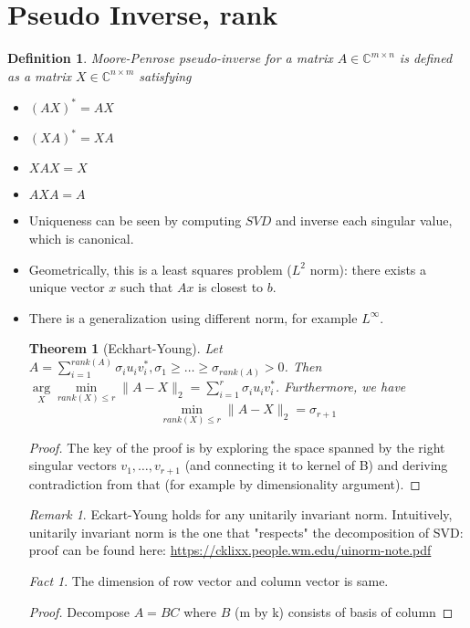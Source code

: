 \documentclass[11pt,reqno]{amsart}
\newtheorem{theorem}{Theorem}
\newtheorem{definition}{Definition}
\theoremstyle{remark}
\newtheorem{remark}[example]{Remark}
\newtheorem{fact}{Fact}
\begin{document}
\section{Pseudo Inverse, rank}
\begin{definition}
Moore-Penrose pseudo-inverse for a matrix $A\in \mathbb{C}^{m\times n}$ is defined as a matrix $X\in\mathbb{C}^{n\times m}$ satisfying
\begin{itemize}
\item $(AX)^*=AX$
\item $(XA)^* = XA$
\item $XAX=X$
\item $AXA=A$
\end{itemize}
\end{definition}
\begin{itemize}
\item Uniqueness can be seen by computing $SVD$ and inverse each singular value, which is canonical.
\item Geometrically, this is a least squares problem ($L^2$ norm): there exists a unique vector $x$ such that $Ax$ is closest to $b$.
\item There is a generalization using different norm, for example $L^\infty$.
\begin{theorem}[Eckhart-Young]
Let $A=\sum\limits^{rank(A)}_{i=1}\sigma_iu_iv_i^*, \sigma_1\geq\dots\geq\sigma_{rank(A)}>0$.
 Then $\arg\limits_X\min\limits_{rank(X)\leq r}\lVert A-X\rVert_2
 =\sum\limits^r_{i=1}\sigma_iu_iv_i^*$. Furthermore, we have 
\[
\min\limits_{rank(X)\leq r}\lVert A-X\rVert_2=\sigma_{r+1}
\]
\end{theorem}
\begin{proof}
The key of the proof is by exploring the space spanned by the right
singular vectors $v_1,\dots,v_{r+1}$ (and connecting it to kernel 
of B) and deriving contradiction from that (for example by 
dimensionality argument).
\end{proof}
\begin{remark}
Eckart-Young holds for any unitarily invariant norm. Intuitively, unitarily invariant norm is the one that "respects" the decomposition of SVD: proof can be found here: \url{https://cklixx.people.wm.edu/uinorm-note.pdf}
\end{remark}
\begin{fact}
The dimension of row vector and column vector is same.
\end{fact}
\begin{proof}
Decompose $A=BC$ where $B$ (m by k) consists of basis of column 

\end{proof}
\end{itemize}
\end{document}
